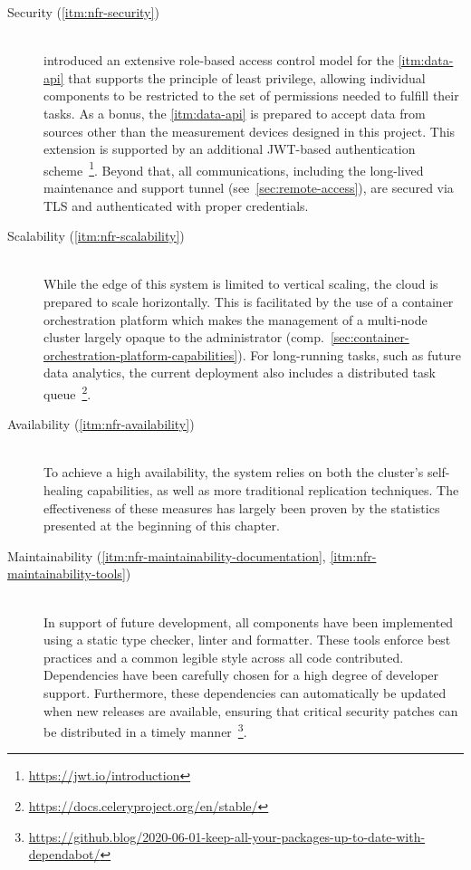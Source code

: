 \begin{description}
  \item[Security (\ref{itm:nfr-security})]
  \hfill \\
   introduced an extensive role-based access control model for the \ref{itm:data-api} that supports the principle of least privilege, allowing individual components to be restricted to the set of permissions needed to fulfill their tasks. As a bonus, the \ref{itm:data-api} is prepared to accept data from sources other than the measurement devices designed in this project. This extension is supported by an additional \acs{JWT}-based authentication scheme~\footnote{\url{https://jwt.io/introduction}}. Beyond that, all communications, including the long-lived maintenance and support tunnel (see~\autoref{sec:remote-access}), are secured via \acs{TLS} and authenticated with proper credentials.

  \item[Scalability (\ref{itm:nfr-scalability})]
  \hfill \\
  While the edge of this system is limited to vertical scaling, the cloud is prepared to scale horizontally. This is facilitated by the use of a container orchestration platform which makes the management of a multi-node cluster largely opaque to the administrator (comp.~\autoref{sec:container-orchestration-platform-capabilities}). For long-running tasks, such as future data analytics, the current deployment also includes a distributed task queue~\footnote{\url{https://docs.celeryproject.org/en/stable/}}.

  \item[Availability (\ref{itm:nfr-availability})]
  \hfill \\
  To achieve a high availability, the system relies on both the cluster's self-healing capabilities, as well as more traditional replication techniques. The effectiveness of these measures has largely been proven by the statistics presented at the beginning of this chapter.

  \item[Maintainability (\ref{itm:nfr-maintainability-documentation}, \ref{itm:nfr-maintainability-tools})]
  \hfill \\
  In support of future development, all components have been implemented using a static type checker, linter and formatter. These tools enforce best practices and a common legible style across all code contributed. Dependencies have been carefully chosen for a high degree of developer support. Furthermore, these dependencies can automatically be updated when new releases are available, ensuring that critical security patches can be distributed in a timely manner~\footnote{\url{https://github.blog/2020-06-01-keep-all-your-packages-up-to-date-with-dependabot/}}.


\end{description}
